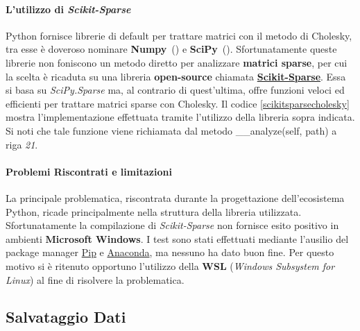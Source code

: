 \paragraph{L'utilizzo di \textit{Scikit-Sparse}}
Python fornisce librerie di default per trattare matrici con il metodo di Cholesky, tra esse è doveroso nominare \textbf{Numpy}~(\cite{harris2020array}) e \textbf{SciPy}~(\cite{2020SciPy-NMeth}). Sfortunatamente queste librerie non foniscono un metodo diretto per analizzare \textbf{matrici sparse}, per cui la scelta è ricaduta su una libreria \textbf{open-source} chiamata \textbf{\href{https://scikit-sparse.readthedocs.io/en/latest/}{Scikit-Sparse}}. Essa si basa su \textit{SciPy.Sparse} ma, al contrario di quest'ultima, offre funzioni veloci ed efficienti per trattare matrici sparse con Cholesky. Il codice \ref{scikitsparsecholesky} mostra l'implementazione effettuata tramite l'utilizzo della libreria sopra indicata. Si noti che tale funzione viene richiamata dal metodo \_\_analyze(self, path) a riga \textit{21}.



\paragraph{Problemi Riscontrati e limitazioni}
La principale problematica, riscontrata durante la progettazione dell'ecosistema Python, ricade principalmente nella struttura della libreria utilizzata. Sfortunatamente la compilazione di \textit{Scikit-Sparse} non fornisce esito positivo in ambienti \textbf{Microsoft Windows}. I test sono stati effettuati mediante l'ausilio del package manager \href{https://pypi.org/project/pip/}{Pip} e \href{https://www.anaconda.com/products/distribution}{Anaconda}, ma nessuno ha dato buon fine. Per questo motivo si è ritenuto opportuno l'utilizzo della \textbf{WSL} (\textit{Windows Subsystem for Linux}) al fine di risolvere la problematica.
\subsection{Salvataggio Dati}

